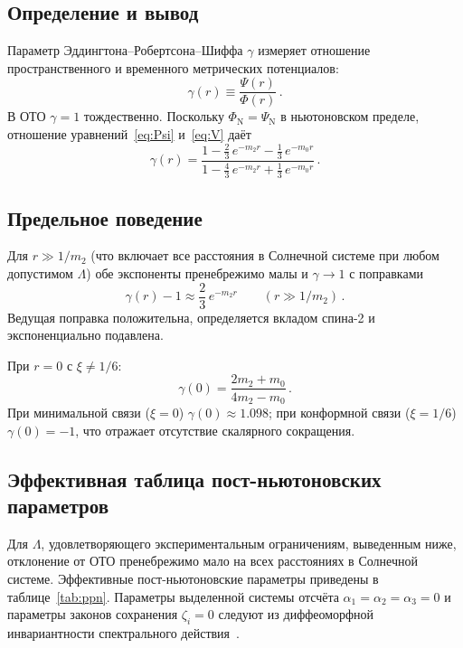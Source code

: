 \documentclass[aps,prd,twocolumn,superscriptaddress,nofootinbib,floatfix]{revtex4-2}
\begin{document}
\subsection{Определение и вывод}

Параметр Эддингтона--Робертсона--Шиффа $\gamma$ измеряет отношение
пространственного и временного метрических потенциалов:
\begin{equation}
  \gamma(r) \equiv \frac{\Psi(r)}{\Phi(r)}\,.
  \label{eq:gamma-def}
\end{equation}
В ОТО $\gamma = 1$ тождественно. Поскольку
$\Phi_\mathrm{N} = \Psi_\mathrm{N}$ в ньютоновском пределе,
отношение уравнений~\eqref{eq:Psi} и~\eqref{eq:V} даёт
\begin{equation}
  \boxed{
    \gamma(r)
    = \frac{1 - \frac{2}{3}\,e^{-m_2 r}
            - \frac{1}{3}\,e^{-m_0 r}}
           {1 - \frac{4}{3}\,e^{-m_2 r}
            + \frac{1}{3}\,e^{-m_0 r}}\,.}
  \label{eq:gamma}
\end{equation}

\subsection{Предельное поведение}

Для $r \gg 1/m_2$ (что включает все расстояния в Солнечной системе
при любом допустимом $\Lambda$) обе экспоненты пренебрежимо малы и
$\gamma \to 1$ с поправками
\begin{equation}
  \gamma(r) - 1 \approx \frac{2}{3}\,e^{-m_2 r}
  \qquad (r \gg 1/m_2)\,.
  \label{eq:gamma-asymp}
\end{equation}
Ведущая поправка положительна, определяется вкладом спина-2 и
экспоненциально подавлена.

При $r = 0$ с $\xi \neq 1/6$:
\begin{equation}
  \gamma(0) = \frac{2m_2 + m_0}{4m_2 - m_0}\,.
  \label{eq:gamma-zero}
\end{equation}
При минимальной связи ($\xi = 0$)
$\gamma(0) \approx 1.098$; при конформной связи
($\xi = 1/6$) $\gamma(0) = -1$, что отражает отсутствие скалярного
сокращения.

\subsection{Эффективная таблица пост-ньютоновских параметров}

Для $\Lambda$, удовлетворяющего экспериментальным ограничениям,
выведенным ниже, отклонение от ОТО пренебрежимо мало на всех
расстояниях в Солнечной системе. Эффективные пост-ньютоновские
параметры приведены в таблице~\ref{tab:ppn}. Параметры выделенной
системы отсчёта $\alpha_1 = \alpha_2 = \alpha_3 = 0$ и параметры
законов сохранения $\zeta_i = 0$ следуют из диффеоморфной инвариантности
спектрального действия~\cite{Will:2014,Chamseddine:1996zu}.
\end{document}
